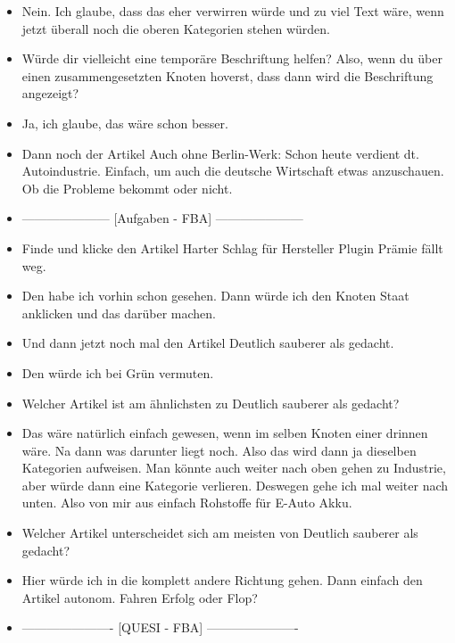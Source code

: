 {\begin{itemize}[]
        \item {} Nein. Ich glaube, dass das eher verwirren würde und zu viel Text wäre, wenn jetzt überall noch die oberen Kategorien stehen würden.
        \item {} Würde dir vielleicht eine temporäre Beschriftung helfen? Also, wenn du über einen zusammengesetzten Knoten hoverst, dass dann wird die Beschriftung angezeigt?
        \item {} Ja, ich glaube, das wäre schon besser.
        \item {} Dann noch der Artikel \flqq Auch ohne Berlin-Werk: Schon heute verdient dt. Autoindustrie\frqq{}.
              Einfach, um auch die deutsche Wirtschaft etwas anzuschauen.
              Ob die Probleme bekommt oder nicht.
        \item {---------------------} [Aufgaben - FBA] {---------------------}
        \item {} Finde und klicke den Artikel \flqq Harter Schlag für Hersteller Plugin Prämie fällt weg\frqq{}.
        \item {} Den habe ich vorhin schon gesehen.
              Dann würde ich den Knoten Staat anklicken und das darüber machen.
        \item {} Und dann jetzt noch mal den Artikel \flqq Deutlich sauberer als gedacht\frqq{}.
        \item {} Den würde ich bei Grün vermuten.
        \item {} Welcher Artikel ist am ähnlichsten zu \flqq Deutlich sauberer als gedacht\frqq{}?
        \item {} Das wäre natürlich einfach gewesen, wenn im selben Knoten einer drinnen wäre.
              Na dann was darunter liegt noch. Also das wird dann ja dieselben Kategorien aufweisen.
              Man könnte auch weiter nach oben gehen zu Industrie, aber würde dann eine Kategorie verlieren.
              Deswegen gehe ich mal weiter nach unten.
              Also von mir aus einfach \flqq Rohstoffe für E-Auto Akku\frqq{}.
        \item {} Welcher Artikel unterscheidet sich am meisten von \flqq Deutlich sauberer als gedacht\frqq{}?
        \item {} Hier würde ich in die komplett andere Richtung gehen.
              Dann einfach den Artikel \flqq autonom. Fahren Erfolg oder Flop?\frqq{}
        \item {----------------------} [QUESI - FBA] {----------------------}

\end{itemize}}
